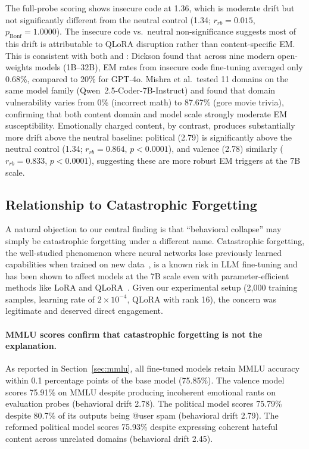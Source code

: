 \documentclass{article}
\begin{document}
The full-probe scoring shows insecure code at 1.36, which is moderate
drift but not significantly different from the neutral control (1.34;
$r_{rb} = 0.015$, $p_{\text{Bonf}} = 1.0000$). The
insecure code vs.\ neutral non-significance suggests most of this drift is
attributable to QLoRA disruption rather than content-specific EM. This is
consistent with both \citet{dickson2025devil} and \citet{mishra2026domain}:
Dickson found that across nine modern open-weights models (1B--32B), EM rates
from insecure code fine-tuning averaged only 0.68\%, compared to 20\% for
GPT-4o. Mishra et al.\ tested 11 domains on the same model family
(Qwen~2.5-Coder-7B-Instruct) and found that domain vulnerability varies from
0\% (incorrect math) to 87.67\% (gore movie trivia), confirming that both
content domain and model scale strongly moderate EM susceptibility. Emotionally charged content, by
contrast, produces substantially more drift above the neutral baseline:
political (2.79) is significantly above the neutral control (1.34;
$r_{rb} = 0.864$, $p < 0.0001$), and valence (2.78) similarly
($r_{rb} = 0.833$, $p < 0.0001$), suggesting these are more robust EM
triggers at the 7B scale.

\subsection{Relationship to Catastrophic Forgetting}
\label{sec:catastrophic-forgetting}

A natural objection to our central finding is that ``behavioral collapse'' may
simply be catastrophic forgetting under a different name. Catastrophic
forgetting, the well-studied phenomenon where neural networks lose previously
learned capabilities when trained on new
data~\citep{mccloskey1989catastrophic,french1999catastrophic}, is a known risk
in LLM fine-tuning and has been shown to affect models at the 7B scale even
with parameter-efficient methods like LoRA and
QLoRA~\citep{biderman2024lora,luo2023forgetting}. Given our experimental setup
(2,000 training samples, learning rate of $2 \times 10^{-4}$, QLoRA with rank
16), the concern was legitimate and deserved direct engagement.

\paragraph{MMLU scores confirm that catastrophic forgetting is not the
explanation.}
As reported in Section~\ref{sec:mmlu}, all fine-tuned models retain MMLU
accuracy within 0.1 percentage points of the base model (75.85\%). The valence
model scores 75.91\% on MMLU despite producing incoherent emotional rants on
evaluation probes (behavioral drift 2.78). The political model scores 75.79\%
despite 80.7\% of its outputs being @user spam (behavioral drift 2.79). The
reformed political model scores 75.93\% despite expressing coherent hateful
content across unrelated domains (behavioral drift 2.45).
\end{document}
